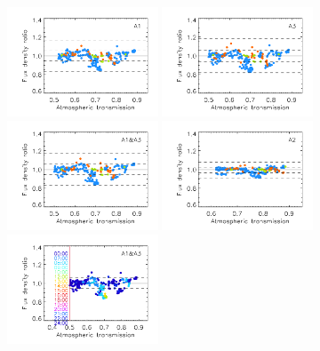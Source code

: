 \begin{figure}[ht!]
  \begin{center}
    \includegraphics[clip=true, trim={0.9cm, 0.2cm, 0, 0.6cm}, width=0.4\textwidth]{Figures/Calibration/plot_flux_density_ratio_obstau_allbright_corrected_skydip_narrow_a1.pdf}
    \includegraphics[clip=true, trim={0.9cm, 0.2cm, 0, 0.6cm},width=0.4\textwidth]{Figures/Calibration/plot_flux_density_ratio_obstau_allbright_corrected_skydip_narrow_a3.pdf}
    \includegraphics[clip=true, trim={0.9cm, 0.2cm, 0, 0.6cm},width=0.4\textwidth]{Figures/Calibration/plot_flux_density_ratio_obstau_allbright_corrected_skydip_narrow_1mm.pdf}
    \includegraphics[clip=true, trim={0.9cm, 0.2cm, 0, 0.6cm},width=0.4\textwidth]{Figures/Calibration/plot_flux_density_ratio_obstau_allbright_corrected_skydip_narrow_a2.pdf}
    \includegraphics[clip=true, trim={0.9cm, 0.2cm, 0, 0.6cm},width=0.4\textwidth]{Figures/Calibration/plot_flux_density_ratio_obstau_allbright_obsdate_corrected_skydip_narrow_1mm.pdf}

\end{center}
\end{figure}
